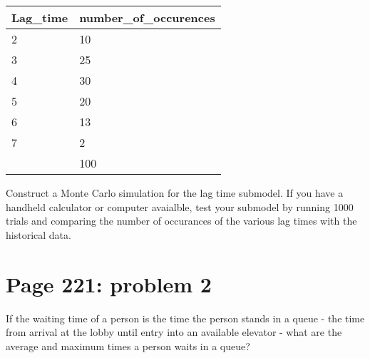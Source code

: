 \documentclass[]{article}
\begin{document}
\begin{longtable}[]{@{}ll@{}}
\toprule
Lag\_time & number\_of\_occurences\tabularnewline
\midrule
\endhead
2 & 10\tabularnewline
3 & 25\tabularnewline
4 & 30\tabularnewline
5 & 20\tabularnewline
6 & 13\tabularnewline
7 & 2\tabularnewline
& 100\tabularnewline
\bottomrule
\end{longtable}

Construct a Monte Carlo simulation for the lag time submodel. If you
have a handheld calculator or computer avaialble, test your submodel by
running 1000 trials and comparing the number of occurances of the
various lag times with the historical data.

\section{Page 221: problem 2}\label{page-221-problem-2}

If the waiting time of a person is the time the person stands in a queue
- the time from arrival at the lobby until entry into an available
elevator - what are the average and maximum times a person waits in a
queue?
\end{document}
